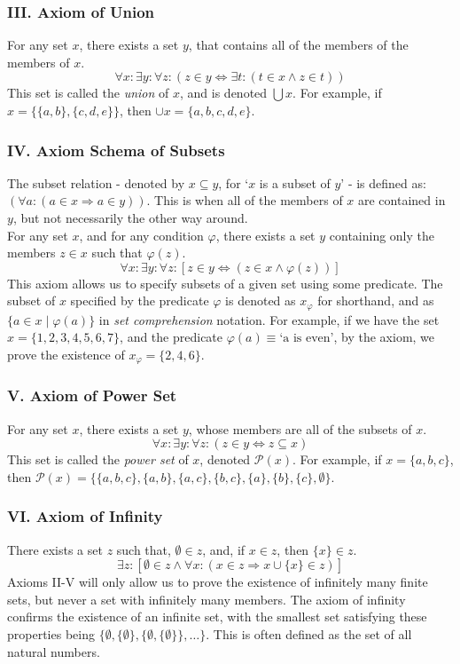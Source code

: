 \documentclass[11pt]{report}
\theoremstyle{definition}
\theoremstyle{theorem}
\theoremstyle{lemma}
\begin{document}
\subsubsection*{III. Axiom of Union}
For any set $x$, there exists a set $y$, that contains all of the members of the members of $x$.
$$\forall x: \exists y: \forall z: (z\in y \Leftrightarrow \exists t: (t\in x \wedge z\in t))$$
This set is called the \emph{union} of $x$, and is denoted $\bigcup x$.
For example, if $x = \{\{a,b\}, \{c,d,e\}\}$, then $\cup x = \{a,b,c,d,e\}$.

\subsubsection*{IV. Axiom Schema of Subsets}
The subset relation - denoted by $x\subseteq y$, for `$x$ is a subset of $y$' - is defined as: $(\forall a: (a\in x \Rightarrow a\in y))$. This is when all of the members of $x$ are contained in $y$, but not necessarily the other way around.\\

\noindent
For any set $x$, and for any condition $\varphi$, there exists a set $y$ containing only the members $z \in x$ such that $\varphi(z)$.
$$\forall x: \exists y: \forall z: [z\in y \Leftrightarrow (z \in x \wedge \varphi(z))] $$
This axiom allows us to specify subsets of a given set using some predicate. The subset of $x$ specified by the predicate $\varphi$ is denoted as $x_\varphi$ for shorthand, and as $\{a\in x \mid \varphi(a)\}$ in \emph{set comprehension} notation. For example, if we have the set $x = \{1,2,3,4,5,6,7\}$, and the predicate $\varphi(a) \equiv \text{`a is even'}$, by the axiom, we prove the existence of $x_\varphi = \{2,4,6\}$.

\subsubsection*{V. Axiom of Power Set}
For any set $x$, there exists a set $y$, whose members are all of the subsets of $x$.
$$\forall x: \exists y: \forall z: (z\in y \Leftrightarrow z \subseteq x)$$
This set is called the \emph{power set} of $x$, denoted $\mathcal{P}(x)$.
For example, if $x = \{a,b,c\}$, then $\mathcal{P}(x) = \{\{a,b,c\},\{a,b\},\{a,c\},\{b,c\}, \{a\}, \{b\}, \{c\}, \emptyset\}$.

\subsubsection*{VI. Axiom of Infinity}
There exists a set $z$ such that, $\emptyset \in z$, and, if $x\in z$, then $\{x\}\in z$.
$$\exists z: [\emptyset\in z \wedge \forall x: (x\in z \Rightarrow x \cup \{x\}\in z)]$$
Axioms II-V will only allow us to prove the existence of infinitely many finite sets, but never a set with infinitely many members. The axiom of infinity confirms the existence of an infinite set, with the smallest set satisfying these properties being $\{ \emptyset, \{\emptyset\}, \{\emptyset, \{\emptyset\}\},\ldots \}$. This is often defined as the set of all natural numbers.
\end{document}
